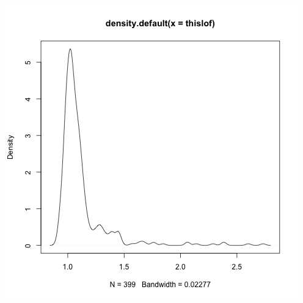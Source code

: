 \documentclass[11pt]{article}
\begin{document}
\begin{enumerate}
\begin{itemize}
\begin{center}
\includegraphics[scale=0.35]{density_lof}
\end{center}

%



\end{itemize}
\end{enumerate}
\end{document}
